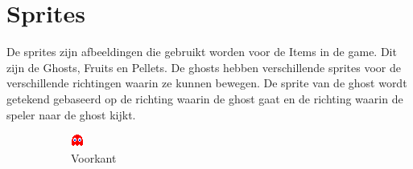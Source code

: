 \documentclass{report}
\begin{document}
  \section{Sprites} %
  \label{sec:sprites}
  De sprites zijn afbeeldingen die gebruikt worden voor de Items in de game. Dit zijn de Ghosts, Fruits en Pellets. De ghosts hebben verschillende sprites voor de verschillende richtingen waarin ze kunnen bewegen. De sprite van de ghost wordt getekend gebaseerd op  de richting waarin de ghost gaat en de richting waarin de speler naar de ghost kijkt.
  \begin{figure}[!ht]
    \centering
    \begin{subfigure}{.24\textwidth}
      \includegraphics[width=\linewidth]{technisch verslag imgs/blinky_middle_one.png}
      \caption{Voorkant}
    \end{subfigure}
    \begin{subfigure}{.24\textwidth}

\end{subfigure}
\end{figure}
\end{document}
